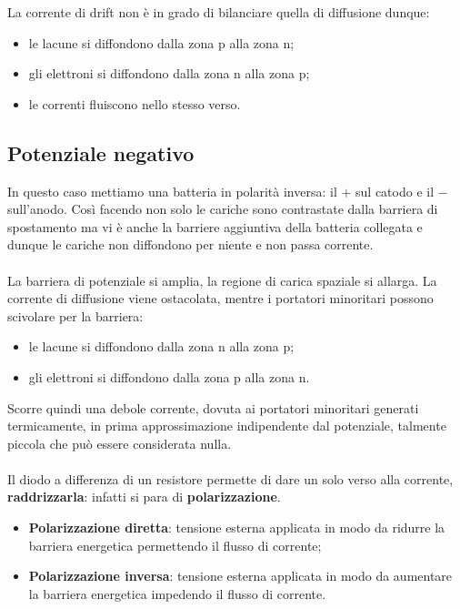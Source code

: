 La	corrente	di	drift non	è	in	grado	di	bilanciare	quella	di	diffusione dunque:
\begin{itemize}
    \item le lacune si	diffondono	dalla	zona	p	alla	zona	n;
    \item gli elettroni si	diffondono	dalla	zona	n	alla	zona	p;
    \item le correnti fluiscono nello stesso verso.
\end{itemize}

\newpage
\subsection{Potenziale	negativo}
In questo caso mettiamo una batteria in polarità inversa: il $+$ sul catodo e il $-$ sull'anodo. Così facendo non solo le cariche sono contrastate dalla barriera di spostamento ma vi è anche la barriere aggiuntiva della batteria collegata e dunque le cariche non diffondono per niente e non passa corrente.

\paragraph{}
La	barriera	di	potenziale	si	amplia, la	regione	di	carica	spaziale	si	allarga. La	corrente	di	diffusione	viene	ostacolata,	mentre	i	portatori	minoritari	possono	scivolare	per	la	barriera:

\begin{itemize}
    \item le lacune si	diffondono	dalla	zona	n	alla	zona	p;
    \item gli elettroni si	diffondono	dalla	zona	p	alla	zona	n.
\end{itemize}

Scorre	quindi	una	debole	corrente,	dovuta	ai	portatori minoritari	generati	termicamente, in	prima	approssimazione	indipendente	dal	potenziale, talmente piccola che può essere considerata nulla.

\paragraph{}
Il diodo a differenza di un resistore permette di dare un solo verso alla corrente, \textbf{raddrizzarla}: infatti si para di \textbf{polarizzazione}.

\begin{itemize}
    \item \textbf{Polarizzazione diretta}: tensione esterna applicata in modo da ridurre la barriera energetica permettendo il flusso di corrente;
    \item \textbf{Polarizzazione inversa}: tensione esterna applicata in modo da aumentare la barriera energetica impedendo il flusso di corrente.
\end{itemize}


